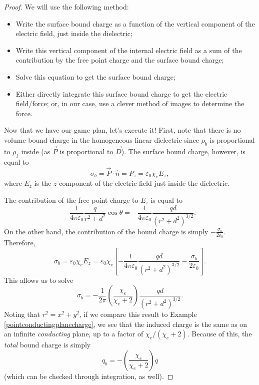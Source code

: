 \begin{proof}
We will use the following method:
\begin{itemize}
    \item Write the surface bound charge as a function of the vertical component of the electric field, just inside the dielectric;
    \item Write this vertical component of the internal electric field as a sum of the contribution by the free point charge and the surface bound charge;
    \item Solve this equation to get the surface bound charge;
    \item Either directly integrate this surface bound charge to get the electric field/force; or, in our case, use a clever method of images to determine the force.
\end{itemize}
Now that we have our game plan, let's execute it! First, note that there is no volume bound charge in the homogeneous linear dielectric since $\rho_b$ is proportional to $\rho_f$ inside (as $\vec{P}$ is proportional to $\vec{D}$). The surface bound charge, however, is equal to
\[\sigma_b=\vec{P}\cdot\hat{n}=P_z=\varepsilon_0\chi_eE_z,\]
where $E_z$ is the $z$-component of the electric field just inside the dielectric.

The contribution of the free point charge to $E_z$ is equal to
\[-\frac{1}{4\pi\varepsilon_0}\frac{q}{r^2+d^2}\cos\theta=-\frac{1}{4\pi\varepsilon_0}\frac{qd}{(r^2+d^2)^{3/2}}.\]
On the other hand, the contribution of the bound charge is simply $-\frac{\sigma_b}{2\varepsilon_0}$. Therefore,
\[\sigma_b=\varepsilon_0\chi_eE_z=\varepsilon_0\chi_e\left[-\frac{1}{4\pi\varepsilon_0}\frac{qd}{(r^2+d^2)^{3/2}}-\frac{\sigma_b}{2\varepsilon_0}\right].\]
This allows us to solve
\[\sigma_b=-\frac{1}{2\pi}\left(\frac{\chi_e}{\chi_e+2}\right)\frac{qd}{(r^2+d^2)^{3/2}}.\]
Noting that $r^2=x^2+y^2$, if we compare this result to Example \ref{pointconductingplanecharge}, we see that the induced charge is the same as on an infinite \textit{conducting} plane, up to a factor of $\chi_e/(\chi_e+2)$. Because of this, the \textit{total} bound charge is simply
\[q_b=-\left(\frac{\chi_e}{\chi_e+2}\right)q\]
(which can be checked through integration, as well).


\end{proof}
